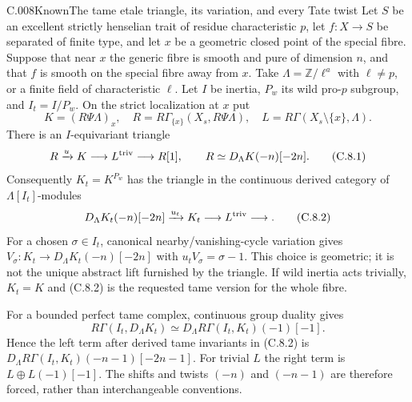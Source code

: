 \begin{saresult}{C.008}{Known}{The tame etale triangle, its variation, and every Tate twist}
Let $S$ be an excellent strictly henselian trait of residue characteristic
$p$, let $f:X\to S$ be separated of finite type, and let $x$ be a geometric
closed point of the special fibre. Suppose that near $x$ the generic
fibre is smooth and pure of dimension $n$, and that $f$ is smooth on the
special fibre away from $x$. Take $\Lambda=\mathbb Z/\ell^a$ with
$\ell\ne p$, or a finite field of characteristic $\ell$.
Let $I$ be inertia, $P_w$ its wild pro-$p$ subgroup, and $I_t=I/P_w$.
On the strict localization at $x$ put
\[
 K=(R\Psi\Lambda)_x,\quad
 R=R\Gamma_{\{x\}}(X_s,R\Psi\Lambda),\quad
 L=R\Gamma(X_s\setminus\{x\},\Lambda).
\]
There is an $I$-equivariant triangle
\[
 R\xrightarrow{u}K\longrightarrow L^{\rm triv}\longrightarrow R[1],
 \qquad R\simeq D_\Lambda K(-n)[-2n].
 \tag{C.8.1}
\]
Consequently $K_t=K^{P_w}$ has the triangle in the continuous derived
category of $\Lambda[I_t]$-modules
\[
 D_\Lambda K_t(-n)[-2n]\xrightarrow{u_t}K_t
 \longrightarrow L^{\rm triv}\longrightarrow.
 \tag{C.8.2}
\]
For a chosen $\sigma\in I_t$, canonical nearby/vanishing-cycle variation
gives $V_\sigma:K_t\to D_\Lambda K_t(-n)[-2n]$ with
$u_tV_\sigma=\sigma-1$. This choice is geometric; it is not the unique
abstract lift furnished by the triangle. If wild inertia acts trivially,
$K_t=K$ and (C.8.2) is the requested tame version for the whole fibre.

For a bounded perfect tame complex, continuous group duality gives
\[
 R\Gamma(I_t,D_\Lambda K_t)
 \simeq D_\Lambda R\Gamma(I_t,K_t)(-1)[-1].
 \tag{C.8.3}
\]
Hence the left term after derived tame invariants in (C.8.2) is
$D_\Lambda R\Gamma(I_t,K_t)(-n-1)[-2n-1]$.
For trivial $L$ the right term is
$L\oplus L(-1)[-1]$. The shifts and twists $(-n)$ and $(-n-1)$
are therefore forced, rather than interchangeable conventions.
\end{saresult}
